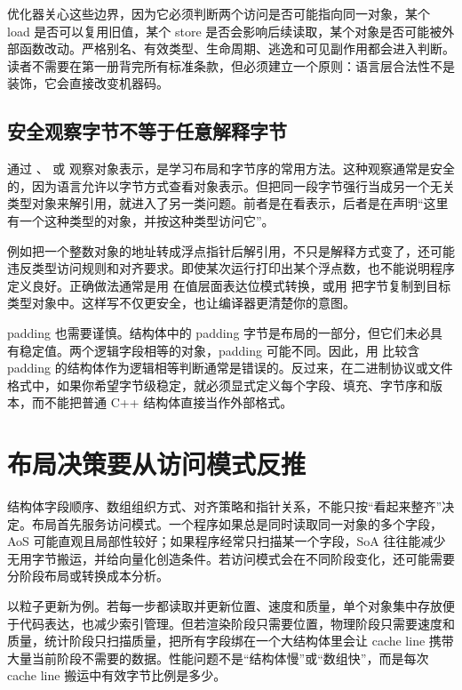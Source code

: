 优化器关心这些边界，因为它必须判断两个访问是否可能指向同一对象，某个 load 是否可以复用旧值，某个 store 是否会影响后续读取，某个对象是否可能被外部函数改动。严格别名、有效类型、生命周期、逃逸和可见副作用都会进入判断。读者不需要在第一册背完所有标准条款，但必须建立一个原则：语言层合法性不是装饰，它会直接改变机器码。

\subsection{安全观察字节不等于任意解释字节}

通过 、 或  观察对象表示，是学习布局和字节序的常用方法。这种观察通常是安全的，因为语言允许以字节方式查看对象表示。但把同一段字节强行当成另一个无关类型对象来解引用，就进入了另一类问题。前者是在看表示，后者是在声明“这里有一个这种类型的对象，并按这种类型访问它”。

例如把一个整数对象的地址转成浮点指针后解引用，不只是解释方式变了，还可能违反类型访问规则和对齐要求。即使某次运行打印出某个浮点数，也不能说明程序定义良好。正确做法通常是用  在值层面表达位模式转换，或用  把字节复制到目标类型对象中。这样写不仅更安全，也让编译器更清楚你的意图。

padding 也需要谨慎。结构体中的 padding 字节是布局的一部分，但它们未必具有稳定值。两个逻辑字段相等的对象，padding 可能不同。因此，用  比较含 padding 的结构体作为逻辑相等判断通常是错误的。反过来，在二进制协议或文件格式中，如果你希望字节级稳定，就必须显式定义每个字段、填充、字节序和版本，而不能把普通 C++ 结构体直接当作外部格式。

\section{布局决策要从访问模式反推}

结构体字段顺序、数组组织方式、对齐策略和指针关系，不能只按“看起来整齐”决定。布局首先服务访问模式。一个程序如果总是同时读取同一对象的多个字段，AoS 可能直观且局部性较好；如果程序经常只扫描某一个字段，SoA 往往能减少无用字节搬运，并给向量化创造条件。若访问模式会在不同阶段变化，还可能需要分阶段布局或转换成本分析。

以粒子更新为例。若每一步都读取并更新位置、速度和质量，单个对象集中存放便于代码表达，也减少索引管理。但若渲染阶段只需要位置，物理阶段只需要速度和质量，统计阶段只扫描质量，把所有字段绑在一个大结构体里会让 cache line 携带大量当前阶段不需要的数据。性能问题不是“结构体慢”或“数组快”，而是每次 cache line 搬运中有效字节比例是多少。

